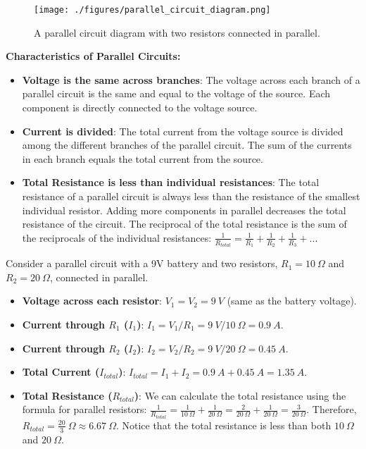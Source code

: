 \begin{figure}[h]
    \centering
    \texttt{[image: ./figures/parallel\_circuit\_diagram.png]}
    \caption{A parallel circuit diagram with two resistors connected in parallel.}
    \label{fig:parallel_circuit}
\end{figure}

\textbf{Characteristics of Parallel Circuits:}

\begin{itemize}
    \item \textbf{Voltage is the same across branches}: The voltage across each branch of a parallel circuit is the same and equal to the voltage of the source.  Each component is directly connected to the voltage source.
    \item \textbf{Current is divided}: The total current from the voltage source is divided among the different branches of the parallel circuit. The sum of the currents in each branch equals the total current from the source.
    \item \textbf{Total Resistance is less than individual resistances}: The total resistance of a parallel circuit is always less than the resistance of the smallest individual resistor.  Adding more components in parallel decreases the total resistance of the circuit. The reciprocal of the total resistance is the sum of the reciprocals of the individual resistances: $\frac{1}{R_{total}} = \frac{1}{R_1} + \frac{1}{R_2} + \frac{1}{R_3} + ...$ 
\end{itemize}

\begin{example}
Consider a parallel circuit with a 9V battery and two resistors, $R_1 = 10\ \Omega$ and $R_2 = 20\ \Omega$, connected in parallel.

\begin{itemize}
    \item \textbf{Voltage across each resistor}: $V_1 = V_2 = 9\ V$ (same as the battery voltage).
    \item \textbf{Current through $R_1$ ($I_1$)}: $I_1 = V_1/R_1 = 9\ V / 10\ \Omega = 0.9\ A$.
    \item \textbf{Current through $R_2$ ($I_2$)}: $I_2 = V_2/R_2 = 9\ V / 20\ \Omega = 0.45\ A$.
    \item \textbf{Total Current ($I_{total}$)}: $I_{total} = I_1 + I_2 = 0.9\ A + 0.45\ A = 1.35\ A$.
    \item \textbf{Total Resistance ($R_{total}$)}: We can calculate the total resistance using the formula for parallel resistors:
    $\frac{1}{R_{total}} = \frac{1}{10\ \Omega} + \frac{1}{20\ \Omega} = \frac{2}{20\ \Omega} + \frac{1}{20\ \Omega} = \frac{3}{20\ \Omega}$.
    Therefore, $R_{total} = \frac{20}{3}\ \Omega \approx 6.67\ \Omega$. Notice that the total resistance is less than both $10\ \Omega$ and $20\ \Omega$.
\end{itemize}
\end{example}

